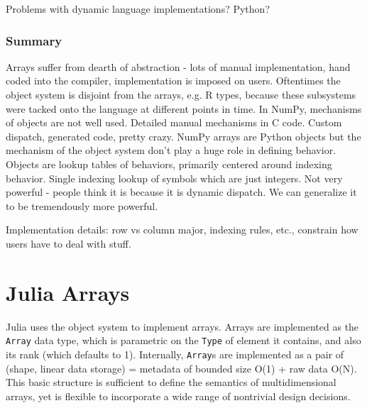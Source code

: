 \documentclass[preprint]{sigplanconf}
\newcommand{\code}[1]{\texttt{#1}}
\begin{document}


Problems with dynamic language implementations? Python?

\subsubsection{Summary}

Arrays suffer from dearth of abstraction - lots of manual implementation, hand
coded into the compiler, implementation is imposed on users. Oftentimes the
object system is disjoint from the arrays, e.g. R types, because these
subsystems were tacked onto the language at different points in time. In
NumPy, mechanisms of objects are not well used. Detailed manual mechanisms in
C code. Custom dispatch, generated code, pretty crazy. NumPy arrays are Python
objects but the mechanism of the object system don't play a huge role in
defining behavior. Objects are lookup tables of behaviors, primarily centered
around indexing behavior. Single indexing lookup of symbols which are just
integers. Not very powerful - people think it is because it is dynamic
dispatch. We can generalize it to be tremendously more powerful.

Implementation details: row vs column major, indexing rules, etc., constrain
how users have to deal with stuff.

\section{Julia Arrays}

Julia uses the object system to implement arrays. Arrays are implemented as
the \code{Array} data type, which is parametric on the \code{Type} of element
it contains, and also its rank (which defaults to 1). Internally,
\code{Array}s are implemented as a pair of (shape, linear data storage) =
metadata of bounded size O(1) + raw data O(N). This basic structure is
sufficient to define the semantics of multidimensional arrays, yet is flexible
to incorporate a wide range of nontrivial design decisions.
\end{document}
